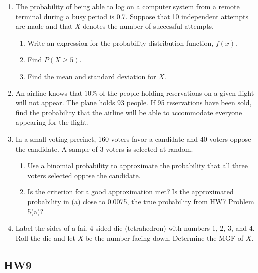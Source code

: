\documentclass[12pt]{article}
\begin{document}
\begin{enumerate}
  \item The probability of being able to log on a computer system from a remote terminal during a busy period is 0.7. Suppose that 10 independent attempts are made and that $X$ denotes the number of successful attempts.
    \begin{enumerate}[label=(\alph*)]
      \item Write an expression for the probability distribution function, $f(x)$.
      \item Find $P(X \ge 5)$.
      \item Find the mean and standard deviation for $X$.
    \end{enumerate}

\newpage

  \item An airline knows that 10\% of the people holding reservations on a given flight will not appear. The plane holds 93 people. If 95 reservations have been sold, find the probability that the airline will be able to accommodate everyone appearing for the flight.

\newpage

  \item In a small voting precinct, 160 voters favor a candidate and 40 voters oppose the candidate. A sample of 3 voters is selected at random.
    \begin{enumerate}[label=(\alph*)]
      \item Use a binomial probability to approximate the probability that all three voters selected oppose the candidate.
      \item Is the criterion for a good approximation met? Is the approximated probability in (a) close to 0.0075, the true probability from HW7 Problem 5(a)?
    \end{enumerate}

\newpage

  \item Label the sides of a fair 4-sided die (tetrahedron) with numbers 1, 2, 3, and 4. Roll the die and let $X$ be the number facing down. Determine the MGF of $X$.

\newpage

\end{enumerate}

\subsection*{HW9}
\end{document}
